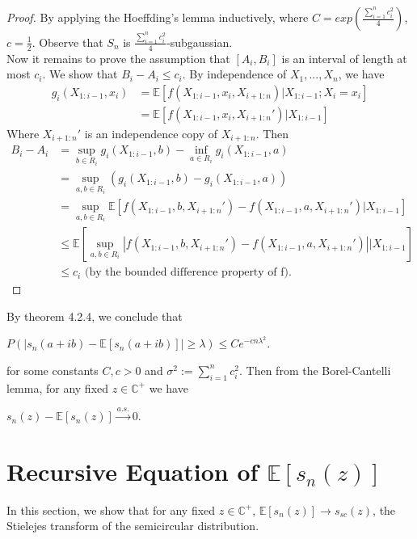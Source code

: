 \documentclass{article}
\begin{document}
\begin{proof}
    By applying the Hoeffding's lemma inductively, where $C = exp(\frac{\sum_{i=1}^n c_i^2}{4})$, $c = \frac{1}{2}$. Observe that $S_n$ is $\frac{\sum_{i=1}^n c_i^2}{4}$-subgaussian.\\
    Now it remains to prove the assumption that $[A_i, B_i]$ is an interval of length at most $c_i$. We show that $B_i - A_i \leq c_i$. By independence of $X_1, ..., X_n$, we have
    \begin{align*}
        g_i(X_{1:i-1}, x_i) &= \mathbb{E}[f(X_{1:i-1},x_i,X_{i+1:n}) | X_{1:i-1};X_i = x_i] \\
        &= \mathbb{E}[f(X_{1:i-1}, x_i, X_{i+1:n}')|X_{1:i-1}]
    \end{align*}
    Where $ X_{i+1:n}'$ is an independence copy of $X_{i+1:n}$. Then
    \begin{align*}
        B_i - A_i &= \sup\limits_{b \in R_i} g_i(X_{1:i-1}, b) - \inf\limits_{a \in R_i} g_i(X_{1:i-1}, a) \\
        &= \sup\limits_{a,b \in R_i} (g_i(X_{1:i-1}, b) - g_i(X_{1:i-1}, a))\\
        &= \sup\limits_{a,b \in R_i} \mathbb{E}[f(X_{1:i-1}, b, X_{i+1:n}') - f(X_{1:i-1}, a, X_{i+1:n}') | X_{1:i-1}]\\
        &\leq \mathbb{E} \left[ \sup\limits_{a,b \in R_i} |f(X_{1:i-1}, b, X_{i+1:n}') - f(X_{1:i-1}, a, X_{i+1:n}')|| X_{1:i-1}\right]\\
        &\leq c_i \text{ (by the bounded difference property of f). }
    \end{align*}
\end{proof}

By theorem 4.2.4, we conclude that
\begin{center}
    $P(|s_n(a+ib) - \mathbb{E}[s_n(a+ib)]| \geq \lambda) \leq Ce^{-cn\lambda^2}$.
\end{center}
for some constants $C, c > 0$ and $\sigma^2 := \sum_{i=1}^n c_i^2$.
Then from the Borel-Cantelli lemma, for any fixed $z \in \mathbb{C}^+$ we have
\begin{center}
    $s_n(z) - \mathbb{E}[s_n(z)] \stackrel{a.s.}{\longrightarrow} 0.$
\end{center}
\section{Recursive Equation of $\mathbb{E}[s_n(z)]$}
In this section, we show that for any fixed $z \in \mathbb{C}^+$, $\mathbb{E}[s_n(z)] \rightarrow s_{sc}(z)$, the Stielejes transform of the semicircular distribution.
\end{document}
